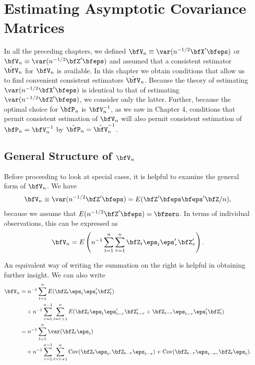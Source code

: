\chapter{Estimating Asymptotic Covariance Matrices}\label{ch:covariance-matrices}

In all the preceding chapters, we defined $\bfV_n \equiv \var(n^{-1/2}\bfX'\bfeps)$ or $\bfV_n \equiv \var(n^{-1/2}\bfZ'\bfeps)$ and assumed that a consistent estimator $\hat{\bfV}_n$ for $\bfV_n$ is available. In this chapter we obtain conditions that allow us to find convenient consistent estimators $\hat{\bfV}_n$. Because the theory of estimating $\var(n^{-1/2}\bfX'\bfeps)$ is identical to that of estimating $\var(n^{-1/2}\bfZ'\bfeps)$, we consider only the latter. Further, because the optimal choice for $\bfP_n$ is $\bfV_n^{-1}$, as we saw in Chapter 4, conditions that permit consistent estimation of $\bfV_n$ will also permit consistent estimation of $\bfP_n = \bfV_n^{-1}$ by $\hat{\bfP}_n = \hat{\bfV}_n^{-1}$.

\section{General Structure of \texorpdfstring{$\bfV_n$}{Vn}}\label{sec:general-structure}

Before proceeding to look at special cases, it is helpful to examine the general form of $\bfV_n$. We have
\[
  \bfV_n \equiv \var(n^{-1/2}\bfZ'\bfeps) = E(\bfZ'\bfeps\bfeps'\bfZ/n),
\]
because we assume that $E(n^{-1/2}\bfZ'\bfeps) = \bfzero$. In terms of individual observations, this can be expressed as
\[
  \bfV_n = E\left(n^{-1}\sum_{t=1}^{n}\sum_{\tau=1}^{n}\bfZ_t\eps_t\eps_\tau'\bfZ_\tau'\right).
\]

An equivalent way of writing the summation on the right is helpful in obtaining further insight. We can also write
\begin{align*}
  \bfV_n &= n^{-1}\sum_{t=1}^{n}E(\bfZ_t\eps_t\eps_t'\bfZ_t') \\
    &\quad + n^{-1}\sum_{\tau=1}^{n-1}\sum_{t=\tau+1}^{n}
      E(\bfZ_t\eps_t\eps_{t-\tau}'\bfZ_{t-\tau}' + \bfZ_{t-\tau}\eps_{t-\tau}\eps_t'\bfZ_t') \\
    &= n^{-1}\sum_{t=1}^{n}\var(\bfZ_t\eps_t) \\
    &\quad + n^{-1}\sum_{\tau=1}^{n-1}\sum_{t=\tau+1}^{n}
      \Cov(\bfZ_t\eps_t,\bfZ_{t-\tau}\eps_{t-\tau}) + \Cov(\bfZ_{t-\tau}\eps_{t-\tau},\bfZ_t\eps_t).
\end{align*}

